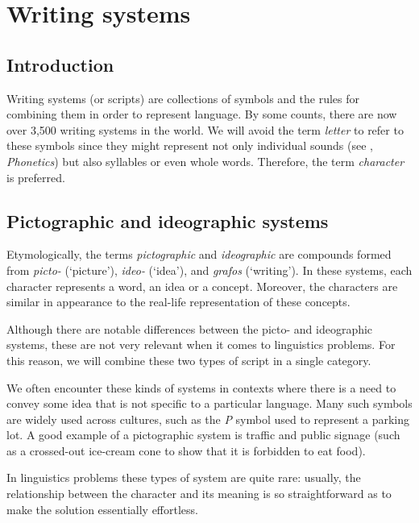 \begin{refsection}
\hypertarget{writing}{%
\chapter{Writing systems}\label{chap-writing}}

\section{Introduction}

Writing systems (or scripts) are collections of symbols and the rules for combining them in order to represent language. By some counts, there are now over 3,500 writing systems in the world. We will avoid the term \textit{letter} to refer to these symbols since they might represent not only individual sounds (see , \textit{Phonetics}) but also syllables or even whole words. Therefore, the term \textit{character} is preferred.

\section{Pictographic and ideographic systems}

Etymologically, the terms \textit{pictographic} and \textit{ideographic} are compounds formed from \textit{picto-} (`picture'), \textit{ideo-} (`idea'), and \textit{grafos} (`writing'). In these systems, each character represents a word, an idea or a concept. Moreover, the characters are similar in appearance to the real-life representation of these concepts.

Although there are notable differences between the picto- and ideographic systems, these are not very relevant when it comes to linguistics problems. For this reason, we will combine these two types of script in a single category.

We often encounter these kinds of systems in contexts where there is a need to convey some idea that is not specific to a particular language. Many such symbols are widely used across cultures, such as the \textit{P} symbol used to represent a parking lot. A good example of a pictographic system is traffic and public signage (such as a crossed-out ice-cream cone to show that it is forbidden to eat food).

In linguistics problems these types of system are quite rare: usually, the relationship between the character and its meaning is so straightforward as to make the solution essentially effortless.


\end{refsection}
